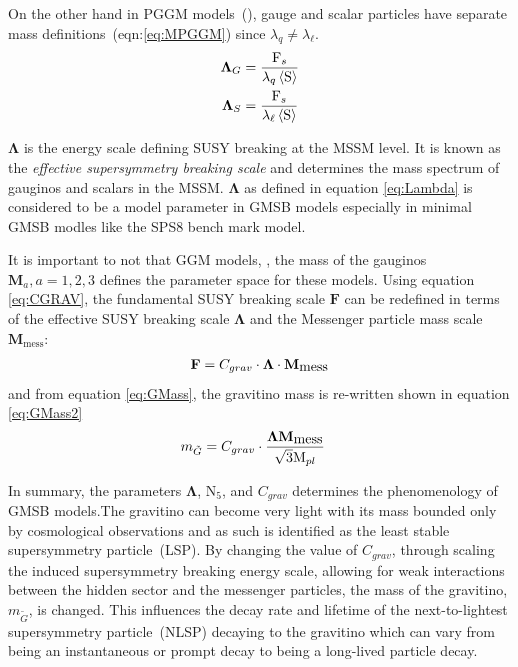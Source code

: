 {On the other hand in PGGM models~(\cite{PGGM}), gauge and scalar particles have separate mass definitions~(eqn:\ref{eq:MPGGM}) since $\lambda_{q} \neq \lambda_{\ell}$.
\begin{align}{\label{eq:MPGGM}}
\mathbf{\Lambda}_{G} &= \frac{\mathrm{F}_{s}}{\lambda_{q} \left\langle \mathrm{S} \right\rangle } \\
\mathbf{\Lambda}_{S} &= \frac{\mathrm{F}_{s}}{\lambda_{\ell} \left\langle \mathrm{S} \right\rangle } 
\end{align}

$\mathbf{\Lambda}$ is the energy scale defining SUSY breaking at the MSSM level. It is known as the \textit{effective supersymmetry breaking scale} and determines the mass spectrum of gauginos and scalars in the MSSM.
$\mathbf{\Lambda}$ as defined in equation \ref{eq:Lambda} is considered to be a model parameter in GMSB models especially in minimal GMSB modles like the SPS8 bench mark model.

It is important to not that GGM models, \cite{GGM, GGM1, GGM2,MDINE1,MDINE2}, the mass of the gauginos $\mathbf{M}_{a}, a = 1,2,3$ defines the parameter space for these models.
Using equation \ref{eq:CGRAV}, the fundamental SUSY breaking scale $\mathbf{F}$ can be redefined in terms of the effective SUSY breaking scale $\mathbf{\Lambda}$  and the Messenger particle mass scale $\mathbf{M}_{\mbox{mess}}$:
\begin{align}{\label{eq:scale}}
\mathbf{F} = C_{grav}\cdot \mathbf{\Lambda}\cdot\mathbf{M}_{\mbox{mess}} 
\end{align}
and from equation \ref{eq:GMass}, the gravitino mass is re-written shown in equation \ref{eq:GMass2}
\begin{align}{\label{eq:GMass2}}
m_{\tilde{G}} & = C_{grav}\cdot \frac{\mathbf{\Lambda}\mathbf{M}_{\mbox{mess}}}{\sqrt{3}\mathrm{M}_{pl}}
\end{align}

In summary, the parameters $\mathbf{\Lambda}$, $\mathrm{N_{5}}$, and  $C_{grav}$  determines the phenomenology of GMSB models.The gravitino can become very light with its mass bounded only by cosmological observations and as such is identified as  the least stable supersymmetry particle~(LSP). By changing the value of $C_{grav}$, through scaling the induced supersymmetry breaking energy scale, allowing for weak interactions between the hidden sector and the messenger particles, the mass of the gravitino, $m_{\tilde{G}}$, is changed. This influences the decay rate and lifetime of the next-to-lightest supersymmetry particle~(NLSP) decaying to the gravitino which can vary from being an instantaneous or prompt decay to being a long-lived particle decay.


}

